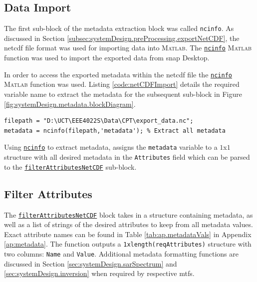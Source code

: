 \subsection{Data Import} \label{subsec:systemDesign.metadata.import}

The first sub-block of the metadata extraction block was called \lstinline{ncinfo}. As discussed in Section \ref{subsec:systemDesign.preProcessing.exportNetCDF}, the \acs{netcdf} file format was used for importing data into \textsc{Matlab}. The \href{https://www.mathworks.com/help/Matlab/ref/ncinfo.html}{\lstinline{ncinfo}} \textsc{Matlab} function was used to import the exported data from \acs{snap} Desktop.

In order to access the exported metadata within the \acs{netcdf} file the \href{https://www.mathworks.com/help/Matlab/ref/ncinfo.html}{\lstinline{ncinfo}} \textsc{Matlab} function was used. Listing \ref{code:netCDFImport} details the required variable name to extract the metadata for the subsequent sub-block in Figure \ref{fig:systemDesign.metadata.blockDiagram}.

\begin{lstlisting}[caption={\textsc{Matlab} code used to import metadata from exported \acs{netcdf} data from \acs{snap} Desktop.},label={code:netCDFImport.metadata}]
filepath = "D:\UCT\EEE4022S\Data\CPT\export_data.nc";
metadata = ncinfo(filepath,'metadata'); % Extract all metadata
\end{lstlisting}

Using \href{https://www.mathworks.com/help/Matlab/ref/ncinfo.html}{\lstinline{ncinfo}} to extract metadata, assigns the \lstinline{metadata} variable to a $1$x$1$ structure with all desired metadata in the \texttt{Attributes} field which can be parsed to the \href{https://github.com/JNSRYA006/sar-parameter-extraction-pipeline/blob/main/functions/preprocess/annotate512Transects.m}{\lstinline{filterAttributesNetCDF}} sub-block.


\subsection{Filter Attributes} \label{subsec:systemDesign.metadata.filter}

The \href{https://github.com/JNSRYA006/sar-parameter-extraction-pipeline/blob/main/functions/preprocess/annotate512Transects.m}{\lstinline{filterAttributesNetCDF}} block takes in a structure containing metadata, as well as a list of strings of the desired attributes to keep from all metadata values. Exact attribute names can be found in Table \ref{tab:ap.metadataVals} in Appendix \ref{ap:metadata}. The function outputs a \texttt{1xlength(reqAttributes)} structure with two columns: \texttt{Name} and \texttt{Value}. Additional metadata formatting functions are discussed in Section \ref{sec:systemDesign.sarSpectrum} and \ref{sec:systemDesign.inversion} when required by respective \acp{mtf}.

